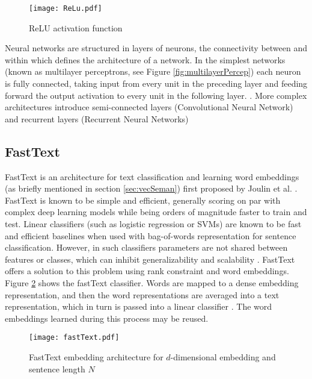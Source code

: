 \documentclass[Dissertation.tex]{subfiles}
\begin{document}
\begin{figure}
	\centering
	\texttt{[image: ReLu.pdf]}

	\caption{ReLU activation function}
	\label{fig:ReLU}

\end{figure}

Neural networks are structured in layers of neurons, the connectivity between and within which defines the architecture of a network. In the simplest networks (known as multilayer perceptrons, see Figure \ref{fig:multilayerPercep}) each neuron is fully connected, taking input from every unit in the preceding layer and feeding forward the output activation to every unit in the following layer. \cite{pattersonDeepLearningPractitioner2017}. More complex architectures introduce semi-connected layers (Convolutional Neural Network) and recurrent layers (Recurrent Neural Networks)\cite{pattersonDeepLearningPractitioner2017}

\cite{jurafskySpeechLanguageProcessing}


\subsection{FastText}


FastText is an architecture for text classification and learning word embeddings (as briefly mentioned in section \ref{sec:vecSeman}) first proposed by Joulin et al. \cite{joulinBagTricksEfficient2016}. FastText is known to be simple and efficient, generally scoring on par with complex deep learning models while being orders of magnitude faster to train and test. Linear classifiers (such as logistic regression or SVMs) are known to be fast and efficient baselines when used with bag-of-words representation for sentence classification. However, in such classifiers parameters are not shared between features or classes, which can inhibit generalizability and scalability \cite{joulinBagTricksEfficient2016}. FastText offers a solution to this problem using rank constraint and word embeddings. Figure \ref{fig:fastTextArch} shows the fastText classifier. Words are mapped to a dense embedding representation, and then the word representations are averaged into a text representation, which in turn is passed into a linear classifier \cite{joulinBagTricksEfficient2016}. The word embeddings learned during this process may be reused. 

\begin{figure}[h]
	\centering
	\texttt{[image: fastText.pdf]}
	\caption{FastText embedding architecture for $ d $-dimensional embedding and sentence length $ N $}
	\label{fig:fastTextArch}
\end{figure}
\end{document}
